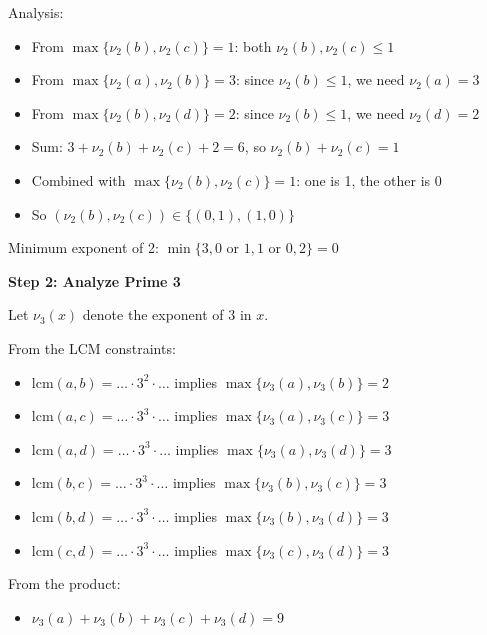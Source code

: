 \documentclass[12pt]{article}
\begin{document}
\begin{techniquesbox}
\begin{itemize}[leftmargin=*]
    Analysis:
    \begin{itemize}
        \item From $\max\{\nu_2(b), \nu_2(c)\} = 1$: both $\nu_2(b), \nu_2(c) \leq 1$
        \item From $\max\{\nu_2(a), \nu_2(b)\} = 3$: since $\nu_2(b) \leq 1$, we need $\nu_2(a) = 3$
        \item From $\max\{\nu_2(b), \nu_2(d)\} = 2$: since $\nu_2(b) \leq 1$, we need $\nu_2(d) = 2$
        \item Sum: $3 + \nu_2(b) + \nu_2(c) + 2 = 6$, so $\nu_2(b) + \nu_2(c) = 1$
        \item Combined with $\max\{\nu_2(b), \nu_2(c)\} = 1$: one is 1, the other is 0
        \item So $(\nu_2(b), \nu_2(c)) \in \{(0,1), (1,0)\}$
    \end{itemize}
    
    Minimum exponent of 2: $\min\{3, 0 \text{ or } 1, 1 \text{ or } 0, 2\} = 0$
    
    \textbf{Step 2: Analyze Prime 3}
    
    Let $\nu_3(x)$ denote the exponent of 3 in $x$.
    
    From the LCM constraints:
    \begin{itemize}
        \item $\text{lcm}(a,b) = \ldots \cdot 3^2 \cdot \ldots$ implies $\max\{\nu_3(a), \nu_3(b)\} = 2$
        \item $\text{lcm}(a,c) = \ldots \cdot 3^3 \cdot \ldots$ implies $\max\{\nu_3(a), \nu_3(c)\} = 3$
        \item $\text{lcm}(a,d) = \ldots \cdot 3^3 \cdot \ldots$ implies $\max\{\nu_3(a), \nu_3(d)\} = 3$
        \item $\text{lcm}(b,c) = \ldots \cdot 3^3 \cdot \ldots$ implies $\max\{\nu_3(b), \nu_3(c)\} = 3$
        \item $\text{lcm}(b,d) = \ldots \cdot 3^3 \cdot \ldots$ implies $\max\{\nu_3(b), \nu_3(d)\} = 3$
        \item $\text{lcm}(c,d) = \ldots \cdot 3^3 \cdot \ldots$ implies $\max\{\nu_3(c), \nu_3(d)\} = 3$
    \end{itemize}
    
    From the product:
    \begin{itemize}
        \item $\nu_3(a) + \nu_3(b) + \nu_3(c) + \nu_3(d) = 9$
    \end{itemize}
    

\end{itemize}
\end{techniquesbox}
\end{document}
